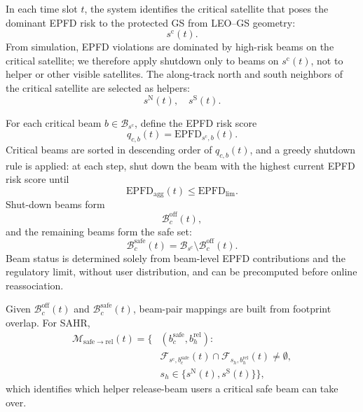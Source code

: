 In each time slot $t$, the system identifies the critical satellite that poses the dominant EPFD risk to the protected GS from LEO--GS geometry:
\begin{equation*}
s^{\mathrm{c}}(t).
\end{equation*}
From simulation, EPFD violations are dominated by high-risk beams on the critical satellite; we therefore apply shutdown only to beams on $s^{\mathrm{c}}(t)$, not to helper or other visible satellites. The along-track north and south neighbors of the critical satellite are selected as helpers:
\begin{equation*}
s^{\mathrm{N}}(t),\quad s^{\mathrm{S}}(t).
\end{equation*}

For each critical beam $b\in\mathcal{B}_{s^{\mathrm{c}}}$, define the EPFD risk score
\begin{equation*}
q_{c,b}(t)=\mathrm{EPFD}_{s^{\mathrm{c}},b}(t).
\end{equation*}
Critical beams are sorted in descending order of $q_{c,b}(t)$, and a greedy shutdown rule is applied: at each step, shut down the beam with the highest current EPFD risk score until
\begin{equation*}
\mathrm{EPFD}_{\mathrm{agg}}(t)\le \mathrm{EPFD}_{\mathrm{lim}}.
\end{equation*}
Shut-down beams form
\begin{equation*}
\mathcal{B}_c^{\mathrm{off}}(t),
\end{equation*}
and the remaining beams form the safe set:
\begin{equation*}
\mathcal{B}_c^{\mathrm{safe}}(t)=\mathcal{B}_{s^{\mathrm{c}}}\setminus \mathcal{B}_c^{\mathrm{off}}(t).
\end{equation*}
Beam status is determined solely from beam-level EPFD contributions and the regulatory limit, without user distribution, and can be precomputed before online reassociation.

Given $\mathcal{B}_c^{\mathrm{off}}(t)$ and $\mathcal{B}_c^{\mathrm{safe}}(t)$, beam-pair mappings are built from footprint overlap. For SAHR,
\begin{equation*}
\begin{split}
\mathcal{M}_{\mathrm{safe}\to\mathrm{rel}}(t)=
\bigl\{
&(b_c^{\mathrm{safe}},b_h^{\mathrm{rel}}) : \\
&\mathcal{F}_{s^{\mathrm{c}},b_c^{\mathrm{safe}}}(t)\cap
\mathcal{F}_{s_h,b_h^{\mathrm{rel}}}(t)\neq\emptyset, \\
& s_h\in\{s^{\mathrm{N}}(t),s^{\mathrm{S}}(t)\}
\bigr\},
\end{split}
\end{equation*}
which identifies which helper release-beam users a critical safe beam can take over.

